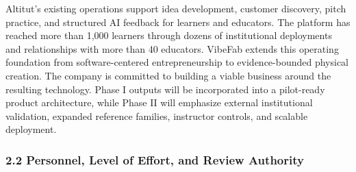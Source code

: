 \documentclass[11pt,letterpaper]{article}
\begin{document}


Altitut's existing operations support idea development, customer discovery, pitch practice, and structured AI feedback for learners and educators. The platform has reached more than 1,000 learners through dozens of institutional deployments and relationships with more than 40 educators. VibeFab extends this operating foundation from software-centered entrepreneurship to evidence-bounded physical creation.
The company is committed to building a viable business around the resulting technology. Phase I outputs will be incorporated into a pilot-ready product architecture, while Phase II will emphasize external institutional validation, expanded reference families, instructor controls, and scalable deployment.

\subsubsection*{2.2 Personnel, Level of Effort, and Review Authority}
\end{document}
